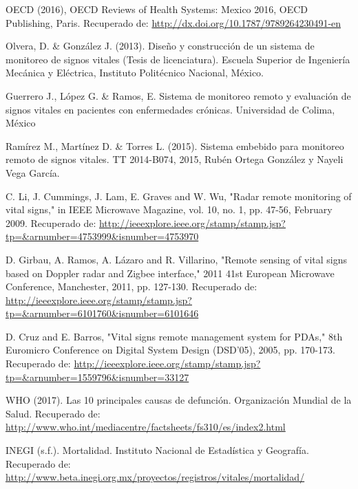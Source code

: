 \begin{thebibliography}{0}
	\setlength{\parsep}{0cm}\setlength{\itemsep}{0cm}\setlength{\topsep}{0cm}
	
	 OECD (2016), OECD Reviews of Health Systems: Mexico 2016, OECD Publishing, Paris. Recuperado de: \url{http://dx.doi.org/10.1787/9789264230491-en}

	 Olvera, D. \& González J. (2013). Diseño y construcción de un sistema de monitoreo de signos vitales (Tesis de licenciatura). Escuela Superior de Ingeniería Mecánica y Eléctrica, Instituto Politécnico Nacional, México.
	
	 Guerrero J., López G. \& Ramos, E. Sistema de monitoreo remoto y evaluación de signos vitales en pacientes con enfermedades crónicas. Universidad de Colima, México
	
	 Ramírez M., Martínez D. \& Torres L. (2015). Sistema embebido para monitoreo remoto de signos vitales. TT 2014-B074, 2015, Rubén Ortega González y  Nayeli Vega García.
	
	 C. Li, J. Cummings, J. Lam, E. Graves and W. Wu, "Radar remote monitoring of vital signs," in IEEE Microwave Magazine, vol. 10, no. 1, pp. 47-56, February 2009. Recuperado de: \url{http://ieeexplore.ieee.org/stamp/stamp.jsp?tp=\&arnumber=4753999\&isnumber=4753970}
	
	 D. Girbau, A. Ramos, A. Lázaro and R. Villarino, "Remote sensing of vital signs based on Doppler radar and Zigbee interface," 2011 41st European Microwave Conference, Manchester, 2011, pp. 127-130. Recuperado de: \url{http://ieeexplore.ieee.org/stamp/stamp.jsp?tp=\&arnumber=6101760\&isnumber=6101646}
	
	 D. Cruz and E. Barros, "Vital signs remote management system for PDAs," 8th Euromicro Conference on Digital System Design (DSD'05), 2005, pp. 170-173. Recuperado de: \url{http://ieeexplore.ieee.org/stamp/stamp.jsp?tp=\&arnumber=1559796\&isnumber=33127}
	
	 WHO (2017). Las 10 principales causas de defunción. Organización Mundial de la Salud. Recuperado de:  \url{http://www.who.int/mediacentre/factsheets/fs310/es/index2.html}
	
	 INEGI (s.f.). Mortalidad. Instituto Nacional de Estadística y Geografía. Recuperado de: \url{http://www.beta.inegi.org.mx/proyectos/registros/vitales/mortalidad/}
	

\end{thebibliography}
